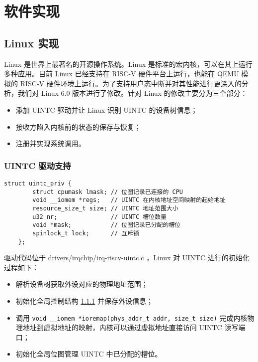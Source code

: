 
\chapter{软件实现}

\section{Linux 实现}

Linux \cite{linux} 是世界上最著名的开源操作系统。Linux 是标准的宏内核，可以在其上运行多种应用。目前 Linux 已经支持在 RISC-V 硬件平台上运行，也能在 QEMU 模拟的 RISC-V 硬件环境上运行。为了支持用户态中断并对其性能进行更深入的分析，我们对 Linux 6.0 版本进行了修改。针对 Linux 的修改主要分为三个部分：

\begin{itemize}
    \item 添加 UINTC 驱动并让 Linux 识别 UINTC 的设备树信息；
    \item 接收方陷入内核前的状态的保存与恢复；
    \item 注册并实现系统调用。
\end{itemize}

\subsection{UINTC 驱动支持}

\label{code:uintcpriv}
\begin{lstlisting}[style=CStyle]
    struct uintc_priv {
        struct cpumask lmask; // 位图记录已连接的 CPU
        void __iomem *regs;   // UINTC 在内核地址空间映射的起始地址
        resource_size_t size; // UINTC 地址范围大小
        u32 nr;               // UINTC 槽位数量
        void *mask;           // 位图记录已分配的槽位
        spinlock_t lock;      // 互斥锁
    };
\end{lstlisting}

驱动代码位于 drivers/irqchip/irq-riscv-uintc.c ，Linux 对 UINTC 进行的初始化过程如下：

\begin{itemize}
    \item 解析设备树获取外设对应的物理地址范围；
    \item 初始化全局控制结构 \ref{code:uintcpriv} 并保存外设信息；
    \item 调用 \texttt{void __iomem *ioremap(phys_addr_t addr, size_t size)} 完成内核物理地址到虚拟地址的映射，内核可以通过虚拟地址直接访问 UINTC 读写端口；
    \item 初始化全局位图管理 UINTC 中已分配的槽位。
\end{itemize}


